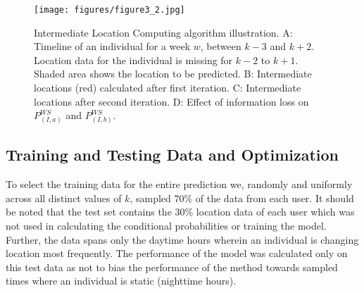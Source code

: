 \begin{figure}[t]
\centering
\texttt{[image: figures/figure3\_2.jpg]}
\caption{Intermediate Location Computing algorithm illustration. A: Timeline of an individual for a week $w$, between $k-3$ and $k+2$. Location data for the individual is missing for $k-2$ to $k+1$. Shaded area shows the location to be predicted. B: Intermediate locations (red) calculated after first iteration. C: Intermediate locations after second iteration. D: Effect of information loss on $P_{(I,a)}^{WS}$ and $P_{(I,b)}^{WS}$.}
\label{ILC_fig}
\end{figure}







\subsection{Training and Testing Data and Optimization}
To select the training data for the entire prediction we, randomly and uniformly across all distinct values of $k$, sampled 70\% of the data from each user. It should be noted that the test set contains the 30\% location data of each user which was not used in calculating the conditional probabilities or training the model. Further, the data spans only the daytime hours wherein an individual is changing location most frequently. The performance of the model was calculated only on this test data as not to bias the performance of the method towards sampled times where an individual is static (nighttime hours). 

